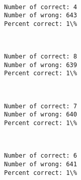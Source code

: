 \documentclass[11pt]{article}
\begin{document}
    \begin{center}
    \end{center}
    { \hspace*{\fill} \\}
    
    \begin{Verbatim}[commandchars=\\\{\}]
Number of correct: 4
Number of wrong: 643
Percent correct: 1\%

    \end{Verbatim}

    \begin{center}
    \end{center}
    { \hspace*{\fill} \\}
    
    \begin{Verbatim}[commandchars=\\\{\}]
Number of correct: 8
Number of wrong: 639
Percent correct: 1\%

    \end{Verbatim}

    \begin{center}
    \end{center}
    { \hspace*{\fill} \\}
    
    \begin{Verbatim}[commandchars=\\\{\}]
Number of correct: 7
Number of wrong: 640
Percent correct: 1\%

    \end{Verbatim}

    \begin{center}
    \end{center}
    { \hspace*{\fill} \\}
    
    \begin{Verbatim}[commandchars=\\\{\}]
Number of correct: 6
Number of wrong: 641
Percent correct: 1\%

    \end{Verbatim}
\end{document}
